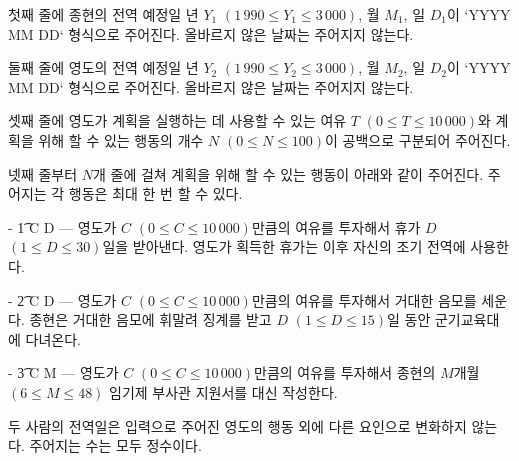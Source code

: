 첫째 줄에 종현의 전역 예정일 년 $Y_1$ $(1\,990 ≤ Y_1 ≤ 3\,000)$, 월 $M_1$, 일 $D_1$이 `YYYY MM DD` 형식으로 주어진다. 올바르지 않은 날짜는 주어지지 않는다.  

둘째 줄에 영도의 전역 예정일 년 $Y_2$ $(1\,990 ≤ Y_2 ≤ 3\,000)$, 월 $M_2$, 일 $D_2$이 `YYYY MM DD` 형식으로 주어진다. 올바르지 않은 날짜는 주어지지 않는다.

셋째 줄에 영도가 계획을 실행하는 데 사용할 수 있는 여유 $T$ $(0 \le T \le 10\,000)$와 계획을 위해 할 수 있는 행동의 개수 $N$ $(0 \le N \le 100)$이 공백으로 구분되어 주어진다.

넷째 줄부터 $N$개 줄에 걸쳐 계획을 위해 할 수 있는 행동이 아래와 같이 주어진다. 주어지는 각 행동은 최대 한 번 할 수 있다.

 - \t{1 C D} --- 영도가 $C$ $(0 \le C \le 10\,000)$만큼의 여유를 투자해서 휴가 $D$ $(1 \le D \le 30)$일을 받아낸다. 영도가 획득한 휴가는 이후 자신의 조기 전역에 사용한다.

 - \t{2 C D} --- 영도가 $C$ $(0 \le C \le 10\,000)$만큼의 여유를 투자해서 거대한 음모를 세운다. 종현은 거대한 음모에 휘말려 징계를 받고 $D$ $(1 \le D \le 15)$일 동안 군기교육대에 다녀온다.

 - \t{3 C M} --- 영도가 $C$ $(0 \le C \le 10\,000)$만큼의 여유를 투자해서 종현의 $M$개월$(6 \le M \le 48)$ 임기제 부사관 지원서를 대신 작성한다.

두 사람의 전역일은 입력으로 주어진 영도의 행동 외에 다른 요인으로 변화하지 않는다. 주어지는 수는 모두 정수이다.
